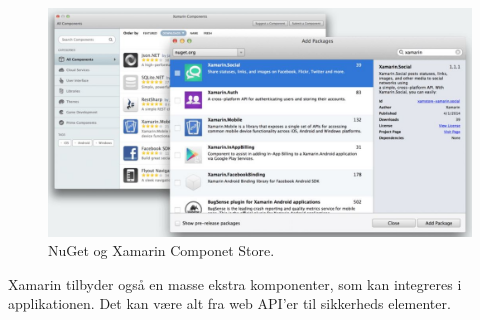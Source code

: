 \begin{figure}[H]
	\centering
	\includegraphics[width=0.7\linewidth]{Applikation/NuGet.JPG}
	\caption{NuGet og Xamarin Componet Store.\cite{Xarmain}}
	\label{fig:NuGet}
\end{figure}
Xamarin tilbyder også en masse ekstra komponenter, som kan integreres i applikationen. Det kan være alt fra web API'er til sikkerheds elementer.

\clearpage
